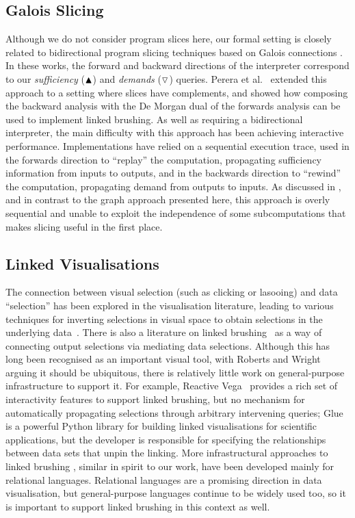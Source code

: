 \subsection{Galois Slicing}

Although we do not consider program slices here, our formal setting is closely related to bidirectional
program slicing techniques based on Galois connections \cite{perera12a,perera16d,ricciotti17}. In these works,
the forward and backward directions of the interpreter correspond to our \emph{sufficiency} ($\blacktriangle$) and
\emph{demands} ($\triangledown$) queries. Perera et al.~\cite{perera22} extended this approach to a setting where
slices have complements, and showed how composing the backward analysis with the De Morgan dual of the
forwards analysis can be used to implement linked brushing. As well as requiring a bidirectional interpreter,
the main difficulty with this approach has been achieving interactive performance. Implementations have relied
on a sequential execution trace, used in the forwards direction to ``replay'' the computation, propagating
sufficiency information from inputs to outputs, and in the backwards direction to ``rewind'' the computation,
propagating demand from outputs to inputs. As discussed in , and in contrast to the graph
approach presented here, this approach is overly sequential and unable to exploit the independence of some
subcomputations that makes slicing useful in the first place.

\subsection{Linked Visualisations}

The connection between visual selection (such as clicking or lasooing) and data ``selection'' has been
explored in the visualisation literature, leading to various techniques for inverting selections in visual
space to obtain selections in the underlying data~\cite{north00,heer08}. There is also a literature on linked
brushing~\cite{becker87,livny97} as a way of connecting output selections via mediating data selections.
Although this has long been recognised as an important visual tool, with Roberts and Wright~\cite{roberts06}
arguing it should be ubiquitous, there is relatively little work on general-purpose infrastructure to support
it. For example, Reactive Vega~\cite{satyanarayan17} provides a rich set of interactivity features to support
linked brushing, but no mechanism for automatically propagating selections through arbitrary intervening
queries; Glue \cite{beaumont13} is a powerful Python library for building linked visualisations for scientific
applications, but the developer is responsible for specifying the relationships between data sets that unpin
the linking. More infrastructural approaches to linked brushing \cite{north00,livny97,psallidas18b}, similar
in spirit to our work, have been developed mainly for relational languages. Relational languages are a
promising direction in data visualisation, but general-purpose languages continue to be widely used too, so it
is important to support linked brushing in this context as well.

